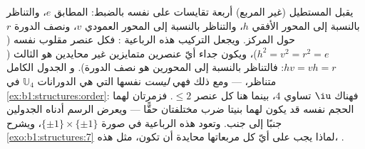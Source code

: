 \begin{example}\label{ex:b1:structures:klein}
يقبل المستطيل (غير المربع) أربعة تقايسات على
نفسه بالضبط:  المطابق $e$، والتناظر بالنسبة إلى المحور الأفقي $h$،
والتناظر بالنسبة إلى المحور العمودي $v$، ونصف الدورة $r$ حول
المركز. ويجعل التركيب هذه  الرباعية : فكل
عنصر مقلوب نفسه ($h^2 = v^2 = r^2 = e$)، ويكون
جداء أيّ عنصرين متمايزين غير محايدين هو الثالث
($hv = vh = r$: فالتناظر بالنسبة إلى المحورين هو نصف الدورة). و
الجدول الكامل متناظر،  --- ومع ذلك فهي
\emph{ليست}  نفسها التي هي  الدورانات $\mathbb U_4$ في
\cref{ex:b1:structures:order}: فهناك  $\iu$ تساوي $4$، بينما
هنا  كل عنصر $\leq 2$. فزمرتان لهما الحجم نفسه
قد يكون لهما بنيتا ضرب مختلفتان حقًّا
--- ويعرض الرسم أدناه الجدولين جنبًا إلى جنب. وتعود هذه
 الرباعية في صورة $\{\pm1\} \times \{\pm1\}$، ويشرح
\cref{exo:b1:structures:7} لماذا يجب على أيّ  كل مربعاتها
محايدة أن تكون، مثل هذه، .
\end{example}

